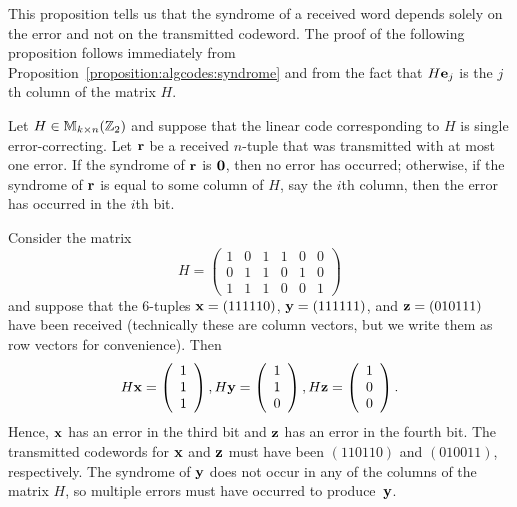 
This proposition tells us that the syndrome of a received word depends
solely on the error and not on the transmitted codeword. The proof of the
following proposition follows immediately from Proposition~\ref{proposition:algcodes:syndrome} and from
the fact that $H{\bold e}_j$ is the $j$th column of the matrix $H$.
 
 \begin{prop}{}
Let $H \in {\Bbb M}_{ k \times n} ( {\Bbb Z}_2)$ and suppose that the
linear code corresponding to $H$ is single error-correcting. Let
${\bold r}$ be a received $n$-tuple that was transmitted with at most
one error. If the syndrome of ${\bold r}$ is ${\bold 0}$, then no
error has occurred; otherwise, if the syndrome of ${\bold r}$ is equal
to some column of $H$, say the $i$th column, then the error has
occurred in the $i$th bit.  
\end{prop}
 
 \begin{example}{}
Consider the matrix
\[
H =
\left(
\begin{array}{cccccc}
1 & 0 & 1 & 1 & 0 & 0 \\
0 & 1 & 1 & 0 & 1 & 0 \\
1 & 1 & 1 & 0 & 0 & 1
\end{array}
\right)
\]
and suppose that the  6-tuples ${\bold x} = (111110)$,
${\bold y} = (111111)$, and ${\bold z} = (010111)$
have been received (technically these are column vectors, but we write them as row vectors for convenience). Then  
\[
H{\bold x} =
\left(
\begin{array}{c} 1 \\ 1 \\ 1 \end{array}
\right),
H{\bold y} =
\left(
\begin{array}{c} 1 \\ 1 \\ 0 \end{array}
\right),
H{\bold z} =
\left(
\begin{array}{c} 1 \\ 0 \\ 0 \end{array}
\right).
\]
Hence, ${\bold x}$ has an error in the third bit and ${\bold z}$ has
an error in the fourth bit. The transmitted codewords for ${\bold x}$
and ${\bold z}$ must have been $(110110)$ and $(010011)$,
respectively. The syndrome of ${\bold y}$ does not occur in any of the
columns of the matrix $H$, so multiple
errors must have occurred to produce~${\bold y}$.
\end{example}
 
